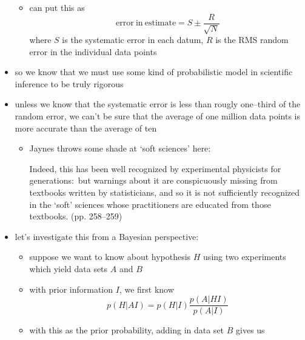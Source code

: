 \documentclass[../jaynes_prob_theory_notes.tex]{subfiles}
\begin{document}
\begin{itemize}
\begin{itemize}
                            \item can put this as
                                \begin{equation*}
                                    \mathrm{error~in~estimate} = S \pm \frac{R}{\sqrt{N}}
                                \end{equation*}
                                where $S$ is the systematic error in each datum, $R$ is the RMS random error in the individual data points
                        \end{itemize}
                    \item so we know that we must use some kind of probabilistic model in scientific inference to be truly rigorous
                    \item unless we know that the systematic error is less than rougly one--third of the random error, we can't be sure that the average of one million data points is more accurate than the average of ten
                        \begin{itemize}
                            \item Jaynes throws some shade at `soft sciences' here:
                                \begin{displayquote}
                                    Indeed, this has been well recognized by experimental physicists for generations:\ but warnings about it are conspicuously missing from textbooks written by statisticians, and so it is not sufficiently recognized in the `soft' sciences whose practitioners are educated from those textbooks. (pp. 258--259)
                                \end{displayquote}
                        \end{itemize}
                    \item let's investigate this from a Bayesian perspective:
                        \begin{itemize}
                            \item suppose we want to know about hypothesis $H$ using two experiments which yield data sets $A$ and $B$
                            \item with prior information $I$, we first know
                                \begin{equation*}
                                    p(H|AI) = p(H|I) \frac{p(A|HI)}{p(A|I)}
                                \end{equation*}
                            \item with this as the prior probability, adding in data set $B$ gives us

\end{itemize}
\end{itemize}
\end{document}
